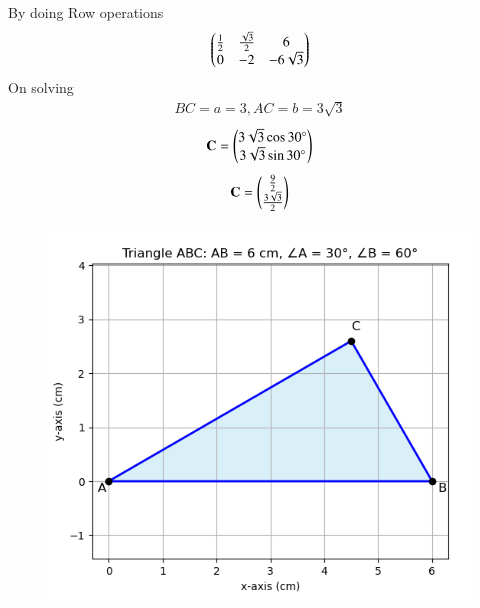 \documentclass[journal,12pt,onecolumn]{IEEEtran}
\begin{document}
By doing Row operations\\
\begin{align}
  \begin{pmatrix}\frac{1}{2}& \frac{\sqrt{3}}{2}&6\\0&-2&-6\sqrt{3}\end{pmatrix}
\end{align}
On solving
\begin{align}
	BC=a=3,AC=b=3\sqrt{3}
\end{align}
\begin{align}
    \mathbf{C}=\begin{pmatrix}3\sqrt{3} \cos 30^\circ\\3\sqrt{3} \sin 30^\circ\end{pmatrix}
\end{align}       
\begin{align}
    \mathbf{C}=\begin{pmatrix}\frac{9}{2}\\ \frac{3\sqrt{3}}{2}\end{pmatrix}
\end{align}
\begin{figure}[H]
\centering
\includegraphics[width=0.7\linewidth]{figs/fig1.png}
\caption{}
\label{fig}
\end{figure}
\end{document}
